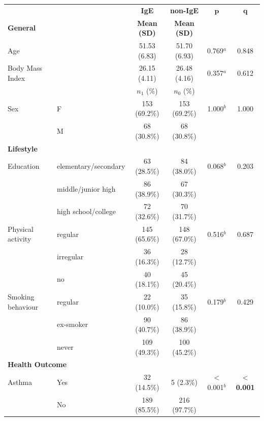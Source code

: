 \begin{table}[h!]
\centering
\setlength{\tabcolsep}{4pt}
\begin{tabular}{llcccc}

 &  & \textbf{IgE} & \textbf{non-IgE} & $\boldsymbol{p}$ & $\boldsymbol{q}$ \\

\multicolumn{2}{l}{\textbf{General}} & \textbf{Mean (SD)} & \textbf{Mean (SD)} & & \\

Age &  & 51.53 (6.83) & 51.70 (6.93) & 0.769$^{a}$ & 0.848 \\
Body Mass Index &  & 26.15 (4.11) & 26.48 (4.16) & 0.357$^{a}$ & 0.612 \\

 & & $n_{1}$ (\%) & $n_{0}$ (\%) & & \\

Sex & F & 153 (69.2\%) & 153 (69.2\%) & 1.000$^{b}$ & 1.000 \\
 & M & 68 (30.8\%) & 68 (30.8\%) &  &  \\

\multicolumn{6}{l}{\textbf{Lifestyle}} \\

Education & elementary/secondary & 63 (28.5\%) & 84 (38.0\%) & 0.068$^{b}$ & 0.203 \\
 & middle/junior high & 86 (38.9\%) & 67 (30.3\%) &  &  \\
 & high school/college & 72 (32.6\%) & 70 (31.7\%) &  &  \\

Physical activity & regular & 145 (65.6\%) & 148 (67.0\%) & 0.516$^{b}$ & 0.687 \\
 & irregular & 36 (16.3\%) & 28 (12.7\%) &  &  \\
 & no & 40 (18.1\%) & 45 (20.4\%) &  &  \\

Smoking behaviour & regular & 22 (10.0\%) & 35 (15.8\%) & 0.179$^{b}$ & 0.429 \\
 & ex-smoker & 90 (40.7\%) & 86 (38.9\%) &  &  \\
 & never & 109 (49.3\%) & 100 (45.2\%) &  &  \\

\multicolumn{6}{l}{\textbf{Health Outcome}} \\

Asthma & Yes & 32 (14.5\%) & 5 (2.3\%) & $<$0.001$^{b}$ & \textbf{$<$0.001} \\
 & No & 189 (85.5\%) & 216 (97.7\%) &  &  \\


\end{tabular}
\end{table}
